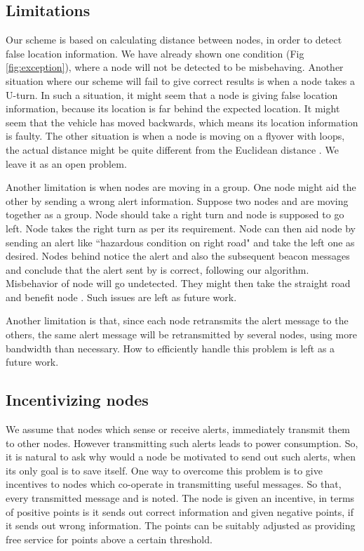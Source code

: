 \documentclass[conference]{IEEEtran}[10pt]
\begin{document}
\subsection{Limitations}
Our scheme is based on calculating distance between nodes, in order to detect false location information. 
We have already shown one condition (Fig \ref{fig:exception}), where a node  will not be detected to be misbehaving.
Another situation where our scheme will fail to give correct results is when a node takes a U-turn. 
In such a situation, it might seem that a node is giving false location information, 
because its location is far behind the expected location.
It might seem that the vehicle has moved backwards, which means its location information is faulty.  
The other situation is when a node is moving on a flyover with loops, 
the actual distance might be quite different from the Euclidean distance . 
We leave it as an open problem. 


Another limitation is when nodes are moving in a group. 
One node might aid the other by sending a wrong alert information. 
Suppose two nodes  and  are moving together as a group. 
Node  should take a right turn and node  is supposed to go left. 
Node  takes the right turn as per its requirement. 
Node  can then aid node  by sending an alert like ``hazardous condition on right road" and take the left one as desired. 
Nodes behind  notice the alert and also the subsequent beacon messages and conclude that the alert sent by  is correct, following our algorithm. 
Misbehavior of node  will go undetected. 
They might then take the straight road and benefit node . 
Such issues are left as future work. 

Another limitation is that, since each node retransmits the alert message to the others, 
the same alert message will be retransmitted by several nodes, using more bandwidth than necessary. 
How to efficiently handle this problem is left as a future work. 

\subsection{Incentivizing nodes}
We assume that nodes which sense or receive alerts, immediately transmit them to other nodes. 
However transmitting such alerts leads to power consumption.
So, it is natural to ask why would a node be motivated to send out such alerts, when its only goal is to save itself. 
One way to overcome this problem is to give incentives to nodes which co-operate in 
transmitting useful messages. 
So that, every transmitted message  and  is noted. 
The node  is given an incentive, in terms of positive points is it sends out correct information and
given negative points, if it sends out wrong information. 
The points can be suitably adjusted as providing free service for points above a certain threshold. 
\end{document}
